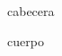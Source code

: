 \documentclass[{{fuente}}pt]{article}
\begin{document}
\sloppy

{{cabecera}}

{{cuerpo}}
\end{document}
